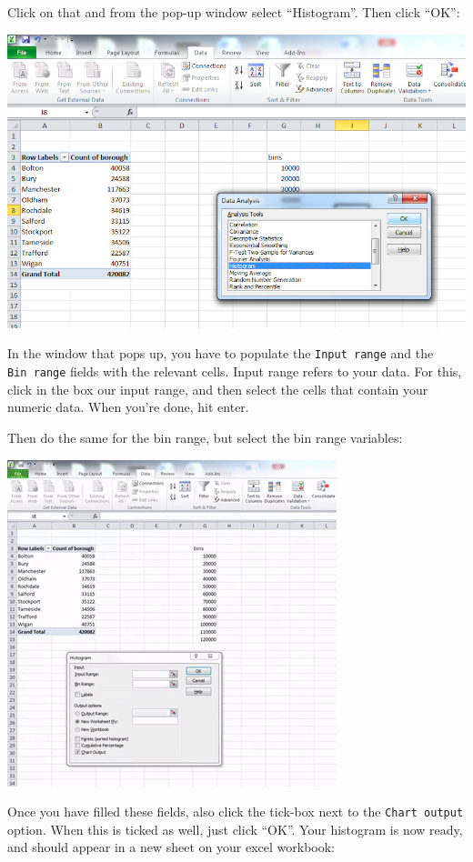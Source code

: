 \documentclass[
]{book}
\begin{document}
Click on that and from the pop-up window select ``Histogram''. Then click ``OK'':

\includegraphics{imgs/dat_pick_hist.png}

In the window that pops up, you have to populate the \texttt{Input\ range} and the \texttt{Bin\ range} fields with the relevant cells. Input range refers to your data. For this, click in the box our input range, and then select the cells that contain your numeric data. When you're done, hit enter.

Then do the same for the bin range, but select the bin range variables:

\includegraphics{imgs/build_histo.gif}

Once you have filled these fields, also click the tick-box next to the \texttt{Chart\ output} option. When this is ticked as well, just click ``OK''. Your histogram is now ready, and should appear in a new sheet on your excel workbook:
\end{document}
